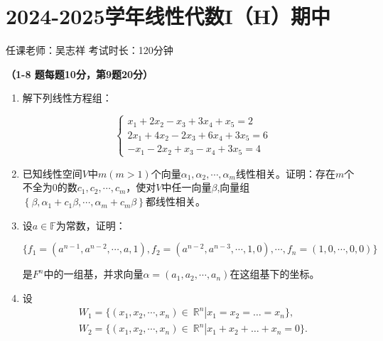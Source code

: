 \section*{2024-2025学年线性代数I（H）期中}

\begin{center}
    任课老师：吴志祥\hspace{4em} 考试时长：120分钟
\end{center}

\bf{（1-8 题每题10分，第9题20分）}

\begin{enumerate}
    \item 解下列线性方程组：

          \[
              \begin{cases}
                  x_1 + 2x_2 - x_3 + 3x_4 +x_5 = 2     \\
                  2x_1 + 4x_2 - 2x_3 + 6x_4 + 3x_5 = 6 \\
                  -x_1 - 2x_2 + x_3 - x_4 + 3x_5 = 4
              \end{cases}
          \]

    \item 已知线性空间\(V\)中\(m(m > 1)\)个向量\(\alpha_1,\alpha_2,\cdots,\alpha_{m}\)线性相关。证明：存在\(m\)个不全为\(0\)的数\(c_1,c_2,\cdots,c_{m}\)，使对\(V\)中任一向量\(\beta\),向量组\(\left\{ \beta,\alpha_1 + c_1\beta,\cdots,\alpha_{m} + c_{m}\beta \right\}\)都线性相关。

    \item 设\(a \in \mathbb{F}\)为常数，证明：

          \[\{ f_1 = \left( a^{n - 1},a^{n - 2},\cdots,a,1 \right),f_2 = \left( a^{n - 2},a^{n - 3},\cdots,1,0 \right),\cdots,f_{n} = (1,0,\cdots,0,0)\}\]

          是\(F^{n}\)中的一组基，并求向量\(\alpha = \left( a_1,a_2,\cdots,a_{n} \right)\)在这组基下的坐标。

    \item 设
          \begin{align*}
              W_1 = \{ \left( x_1,x_2,\cdots,x_{n} \right) \in \left. \ \mathbb{R}^{n} \right|x_1 = x_2 = \ldots = x_{n} \}, \\
              W_2 = \{ \left( x_1,x_2,\cdots,x_{n} \right) \in \left. \ \mathbb{R}^{n} \right|x_1 + x_2 + \ldots + x_{n} = 0 \}.
          \end{align*}


\end{enumerate}
